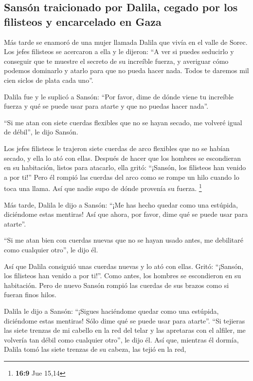 \hypertarget{sansuxf3n-traicionado-por-dalila-cegado-por-los-filisteos-y-encarcelado-en-gaza}{%
\subsection{Sansón traicionado por Dalila, cegado por los filisteos y
encarcelado en
Gaza}\label{sansuxf3n-traicionado-por-dalila-cegado-por-los-filisteos-y-encarcelado-en-gaza}}

 Más tarde se enamoró de una mujer llamada Dalila que
vivía en el valle de Sorec.  Los jefes filisteos se
acercaron a ella y le dijeron: ``A ver si puedes seducirlo y conseguir
que te muestre el secreto de su increíble fuerza, y averiguar cómo
podemos dominarlo y atarlo para que no pueda hacer nada. Todos te
daremos mil cien siclos de plata cada uno''.

 Dalila fue y le suplicó a Sansón: ``Por favor, dime de
dónde viene tu increíble fuerza y qué se puede usar para atarte y que no
puedas hacer nada''.

 ``Si me atan con siete cuerdas flexibles que no se hayan
secado, me volveré igual de débil'', le dijo Sansón.

 Los jefes filisteos le trajeron siete cuerdas de arco
flexibles que no se habían secado, y ella lo ató con ellas.
 Después de hacer que los hombres se escondieran en su
habitación, listos para atacarlo, ella gritó: ``¡Sansón, los filisteos
han venido a por ti!'' Pero él rompió las cuerdas del arco como se rompe
un hilo cuando lo toca una llama. Así que nadie supo de dónde provenía
su fuerza. \footnote{\textbf{16:9} Jue 15,14}

 Más tarde, Dalila le dijo a Sansón: ``¡Me has hecho
quedar como una estúpida, diciéndome estas mentiras! Así que ahora, por
favor, dime qué se puede usar para atarte''.

 ``Si me atan bien con cuerdas nuevas que no se hayan
usado antes, me debilitaré como cualquier otro'', le dijo él.

 Así que Dalila consiguió unas cuerdas nuevas y lo ató
con ellas. Gritó: ``¡Sansón, los filisteos han venido a por ti!''. Como
antes, los hombres se escondieron en su habitación. Pero de nuevo Sansón
rompió las cuerdas de sus brazos como si fueran finos hilos.

 Dalila le dijo a Sansón: ``¡Sigues haciéndome quedar
como una estúpida, diciéndome estas mentiras! Sólo dime qué se puede
usar para atarte''. ``Si tejieras las siete trenzas de mi cabello en la
red del telar y las apretaras con el alfiler, me volvería tan débil como
cualquier otro'', le dijo él. Así que, mientras él dormía, Dalila tomó
las siete trenzas de su cabeza, las tejió en la red,


